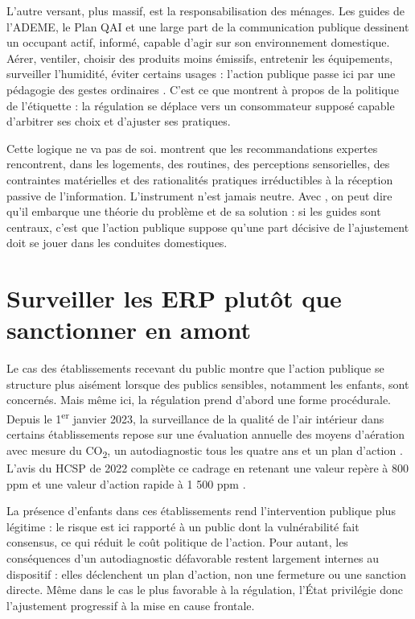 \documentclass[a4paper,12pt,twoside]{book}
\begin{document}
L'autre versant, plus massif, est la responsabilisation des ménages. Les guides de l'ADEME, le Plan QAI et une large part de la communication publique dessinent un occupant actif, informé, capable d'agir sur son environnement domestique. Aérer, ventiler, choisir des produits moins émissifs, entretenir les équipements, surveiller l'humidité, éviter certains usages : l'action publique passe ici par une pédagogie des gestes ordinaires \parencite{ADEME2024AirSainChezSoi,ADEME2023BienVentiler,PlanQAI2013}. C'est ce que \textcite{HourcadeLeBourhis2024PolitiqueEtiquette} montrent à propos de la \og politique de l'étiquette \fg : la régulation se déplace vers un consommateur supposé capable d'arbitrer ses choix et d'ajuster ses pratiques.

Cette logique ne va pas de soi. \textcite{MinoustchinVeraNavas2010RepresentationsComportementsQAI} montrent que les recommandations expertes rencontrent, dans les logements, des routines, des perceptions sensorielles, des contraintes matérielles et des rationalités pratiques irréductibles à la réception passive de l'information. L'instrument n'est jamais neutre. Avec \textcite{LascoumesLeGales2004GouvernerParLesInstruments}, on peut dire qu'il embarque une théorie du problème et de sa solution : si les guides sont centraux, c'est que l'action publique suppose qu'une part décisive de l'ajustement doit se jouer dans les conduites domestiques.

\section{Surveiller les ERP plutôt que sanctionner en amont}

Le cas des établissements recevant du public montre que l'action publique se structure plus aisément lorsque des publics sensibles, notamment les enfants, sont concernés. Mais même ici, la régulation prend d'abord une forme procédurale. Depuis le 1\textsuperscript{er} janvier 2023, la surveillance de la qualité de l'air intérieur dans certains établissements repose sur une évaluation annuelle des moyens d'aération avec mesure du CO\textsubscript{2}, un autodiagnostic tous les quatre ans et un plan d'action \parencite{Decret2022ERP,MinistereEcologieQAI2025}. L'avis du HCSP de 2022 complète ce cadrage en retenant une valeur repère à 800 ppm et une valeur d'action rapide à 1 500 ppm \parencite{HCSP2022CO2ERP}.

La présence d'enfants dans ces établissements rend l'intervention publique plus légitime : le risque est ici rapporté à un public dont la vulnérabilité fait consensus, ce qui réduit le coût politique de l'action. Pour autant, les conséquences d'un autodiagnostic défavorable restent largement internes au dispositif : elles déclenchent un plan d'action, non une fermeture ou une sanction directe. Même dans le cas le plus favorable à la régulation, l'État privilégie donc l'ajustement progressif à la mise en cause frontale.
\end{document}
